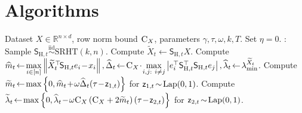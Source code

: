 \documentclass[11pt]{article}
\theoremstyle{definition}
\theoremstyle{plain}
\newcommand{\reals}{\mathbb{R}}
\newcommand{\abs}[1]{\left| #1 \right|}
\newcommand{\Norm}[1]{\left\| #1 \right\|}
\providecommand{\norm}[1]{\Norm{#1}}
\newcommand{\simiid}{\overset{\mathrm{iid}}{\sim}}
\begin{document}
\section{Algorithms}
\label{app:algos}

\begin{algorithm}[H]
    \caption{Multiple Fast Mixing}
    \label{alg:gauss_fast_mix_eta} 
    \begin{algorithmic}[1]
        \Require Dataset $X\in\reals^{n\times d}$, row norm bound $\textsc{C}_X$, parameters $\gamma,\tau,\omega, k, T$.
        \State Set $\eta = 0$.
        : 
            \State Sample $\mathsf{S}_{\mathrm{H}, t}\simiid \mathrm{SRHT}(k, n)$. 
            \State Compute $\widetilde{X}_t \gets \mathsf{S}_{\mathrm{H}, t}X$.
            \State Compute $\widehat{m}_t \hspace{-0.15em}\gets\hspace{-0.15em} \underset{i\in[n]}{\max} \norm{\widetilde{X}^{\top}_t\hspace{-0.15em}\mathsf{S}_{\mathrm{H}, t}e_i \hspace{-0.15em}-\hspace{-0.15em} x_i}, \widehat{\Delta}_t \hspace{-0.15em}\gets\hspace{-0.15em}  \textsc{C}_X \hspace{-0.15em}\cdot\hspace{-0.15em} \underset{i,j: \ i\ne j}{\max} \abs{e^{\top}_i\mathsf{S}^{\top}_{\mathrm{H}, t}\mathsf{S}_{\mathrm{H}, t}e_j}, \widehat{\lambda}_t \hspace{-0.15em}\gets\hspace{-0.15em} \lambda^{\widetilde{X}_t}_{\min}$. 
            \State Compute $\widetilde{m}_t \hspace{-0.15em}\gets\hspace{-0.15em}\max\left\{0, \widehat{m}_t \hspace{-0.15em}+\hspace{-0.15em} \omega \widehat{\Delta}_t (\tau \hspace{-0.15em}-\hspace{-0.15em} \mathsf{z}_{1,t})\right\}$ for $\mathsf{z}_{1,t} \hspace{-0.15em}\sim\hspace{-0.15em} \mathrm{Lap}(0, 1)$. 
            \State Compute $\widetilde{\lambda}_t \hspace{-0.15em}\gets\hspace{-0.15em} \max\left\{0, \widehat{\lambda}_t \hspace{-0.15em}-\hspace{-0.15em} \omega\textsc{C}_X \left(\textsc{C}_X + 2\widetilde{m}_t\right) \left(\tau \hspace{-0.15em}-\hspace{-0.15em} \mathsf{z}_{2,t}\right)\right\}$ for $\mathsf{z}_{2,t} \hspace{-0.15em}\sim\hspace{-0.15em} \mathrm{Lap}(0, 1)$.

\end{algorithmic}
\end{algorithm}
\end{document}

